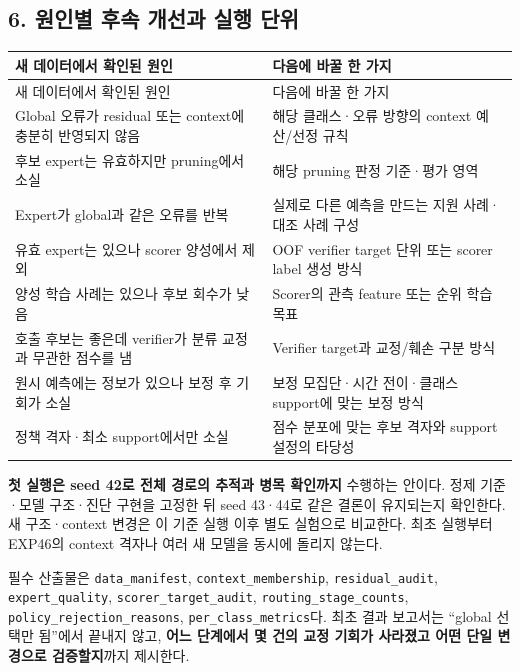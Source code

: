 \subsection{6. 원인별 후속 개선과 실행 단위}
\begingroup
\footnotesize
\begin{longtable}{>{\raggedright\arraybackslash}p{}>{\raggedright\arraybackslash}p{}}
\toprule
새 데이터에서 확인된 원인 & 다음에 바꿀 한 가지 \\ \midrule
\endfirsthead
새 데이터에서 확인된 원인 & 다음에 바꿀 한 가지 \\ \midrule
\endhead
{}Global 오류가 residual 또는 context에 충분히 반영되지 않음 & 해당 클래스·오류 방향의 context 예산/\allowbreak{}선정 규칙 \\
{}후보 expert는 유효하지만 pruning에서 소실 & 해당 pruning 판정 기준·평가 영역 \\
{}Expert가 global과 같은 오류를 반복 & 실제로 다른 예측을 만드는 지원 사례·대조 사례 구성 \\
{}유효 expert는 있으나 scorer 양성에서 제외 & OOF verifier target 단위 또는 scorer label 생성 방식 \\
{}양성 학습 사례는 있으나 후보 회수가 낮음 & Scorer의 관측 feature 또는 순위 학습 목표 \\
{}호출 후보는 좋은데 verifier가 분류 교정과 무관한 점수를 냄 & Verifier target과 교정/\allowbreak{}훼손 구분 방식 \\
{}원시 예측에는 정보가 있으나 보정 후 기회가 소실 & 보정 모집단·시간 전이·클래스 support에 맞는 보정 방식 \\
{}정책 격자·최소 support에서만 소실 & 점수 분포에 맞는 후보 격자와 support 설정의 타당성 \\
\bottomrule
\end{longtable}
\endgroup
\textbf{첫 실행은 seed 42로 전체 경로의 추적과 병목 확인까지} 수행하는 안이다. 정제 기준·모델 구조·진단 구현을 고정한 뒤 seed 43·44로 같은 결론이 유지되는지 확인한다. 새 구조·context 변경은 이 기준 실행 이후 별도 실험으로 비교한다. 최초 실행부터 EXP46의 context 격자나 여러 새 모델을 동시에 돌리지 않는다.

필수 산출물은 \texttt{data\_\allowbreak{}\allowbreak{}man\allowbreak{}ifest}, \texttt{context\_\allowbreak{}\allowbreak{}membersh\allowbreak{}ip}, \texttt{residual\allowbreak{}\_\allowbreak{}\allowbreak{}audit}, \texttt{expert\_\allowbreak{}\allowbreak{}q\allowbreak{}uality}, \texttt{scorer\_\allowbreak{}\allowbreak{}t\allowbreak{}arget\_\allowbreak{}\allowbreak{}au\allowbreak{}dit}, \texttt{routing\_\allowbreak{}\allowbreak{}stage\_\allowbreak{}\allowbreak{}co\allowbreak{}unts}, \texttt{policy\_\allowbreak{}\allowbreak{}r\allowbreak{}ejection\allowbreak{}\_\allowbreak{}\allowbreak{}reasons\allowbreak{}}, \texttt{per\_\allowbreak{}\allowbreak{}clas\allowbreak{}s\_\allowbreak{}\allowbreak{}metric\allowbreak{}s}다. 최초 결과 보고서는 “global 선택만 됨”에서 끝내지 않고, \textbf{어느 단계에서 몇 건의 교정 기회가 사라졌고 어떤 단일 변경으로 검증할지}까지 제시한다.

